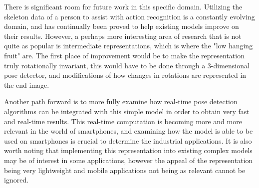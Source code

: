 There is significant room for future work in this specific domain. Utilizing the skeleton data of a person to assist with action recognition is a constantly evolving domain, and has continually been proved to help existing models improve on their results. However, a perhaps more interesting area of research that is not quite as popular is intermediate representations, which is where the "low hanging fruit" are. The first place  of improvement would be to make the representation truly rotationally invariant, this would have to be done through a 3-dimensional pose detector, and modifications of how changes in rotations are represented in the end image. 

Another path forward is to more fully examine how real-time pose detection algorithms can be integrated with this simple model in order to obtain very fast and real-time results. This real-time computation is becoming more and more relevant in the world of smartphones, and examining how the model is able to be used on smartphones is crucial to determine the industrial applications. It is also worth noting that implementing this representation into existing complex models may be of interest in some applications, however the appeal of the representation being very lightweight and mobile applications not being as relevant cannot be ignored.